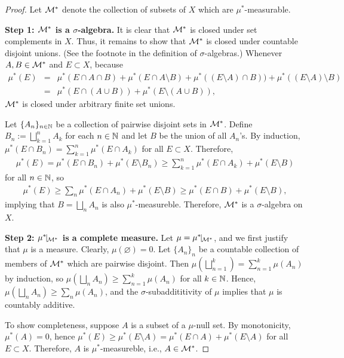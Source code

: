 \begin{proof}
    Let ${\mathcal{M}}^*$ denote the collection of subsets of $X$ which are $\mu^*$-measurable.
    
    \textbf{Step 1: ${\mathcal{M}}^*$ is a $\sigma$-algebra.}\newline\noindent
    It is clear that ${\mathcal{M}}^*$ is closed under set complements in $X$.
    Thus, it remains to show that ${\mathcal{M}}^*$ is closed under countable disjoint unions. (See the footnote in the definition of $\sigma$-algebras.)
    Whenever $A, B\in{\mathcal{M}}^*$ and $E\subset X$, because
    \begin{eqnarray*}
        \mu^*(E)
        &=&\mu^*(E\cap A\cap B)+\mu^*(E\cap A\setminus B)+\mu^*((E\setminus A)\cap B))+\mu^*((E\setminus A)\setminus B)\\
        &=&\mu^*(E\cap(A\cup B))+\mu^*(E\setminus(A\cup B)),
    \end{eqnarray*}
    ${\mathcal{M}}^*$ is closed under arbitrary finite set unions.

    Let $\{A_n\}_{n\in{\mathbb{N}}}$ be a collection of pairwise disjoint sets in ${\mathcal{M}}^*$.
    Define $B_n:=\bigsqcup_{k=1}^n A_k$ for each $n\in{\mathbb{N}}$ and let $B$ be the union of all $A_n$'s.
    By induction, $\mu^*(E\cap B_n)=\sum_{k=1}^n\mu^*(E\cap A_k)$ for all $E\subset X$.
    Therefore,
    \begin{align*}
        \mu^*(E)=\mu^*(E\cap B_n)+\mu^*(E\setminus B_n)\geq\sum_{k=1}^n\mu^*(E\cap A_k)+\mu^*(E\setminus B)
    \end{align*}
    for all $n\in{\mathbb{N}}$, so
    \begin{align*}
        \mu^*(E)\geq\sum_n\mu^*(E\cap A_n)+\mu^*(E\setminus B)\geq\mu^*(E\cap B)+\mu^*(E\setminus B),
    \end{align*}
    implying that $B=\bigsqcup_n A_n$ is also $\mu^*$-measureble.
    Therefore, ${\mathcal{M}}^*$ is a $\sigma$-algebra on $X$.

    \textbf{Step 2: $\mu^*\vline_{\mc{M}^*}$ is a complete measure.}\newline\noindent
    Let $\mu=\mu^*\vline_{\mc{M}^*}$, and we first justify that $\mu$ is a measure.
    Clearly, $\mu(\varnothing)=0$.
    Let $\{A_n\}_n$ be a countable collection of members of ${\mathcal{M}}^*$ which are pairwise disjoint.
    Then $\mu(\bigsqcup_{n=1}^k)=\sum_{n=1}^k \mu(A_n)$ by induction, so $\mu(\bigsqcup_n A_n)\geq\sum_{n=1}^k \mu(A_n)$ for all $k\in{\mathbb{N}}$.
    Hence, $\mu(\bigsqcup_n A_n)\geq\sum_n \mu(A_n)$, and the $\sigma$-subaddititivity of $\mu$ implies that $\mu$ is countably additive.
    
    To show completeness, suppose $A$ is a subset of a $\mu$-null set.
    By monotonicity, $\mu^*(A)=0$, hence $\mu^*(E)\geq\mu^*(E\setminus A)=\mu^*(E\cap A)+\mu^*(E\setminus A)$ for all $E\subset X$.
    Therefore, $A$ is $\mu^*$-measureble, i.e., $A\in{\mathcal{M}}^*$.
\end{proof}

